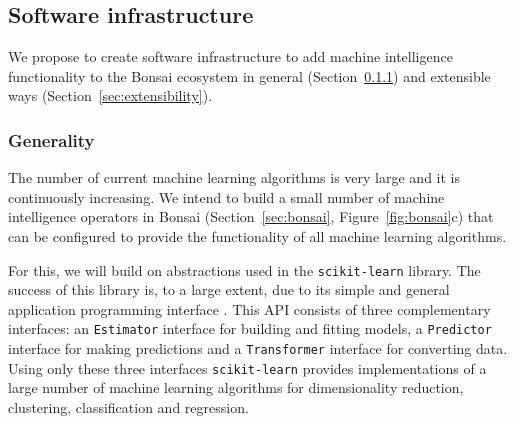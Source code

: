 \subsection{Software infrastructure}
\label{sec:infrastructure}

We propose to create software infrastructure to add machine intelligence
functionality to the Bonsai ecosystem in general
(Section~\ref{sec:generality}) and extensible ways
(Section~\ref{sec:extensibility}).

\subsubsection{Generality}
\label{sec:generality}

The number of current machine learning algorithms is very large and it is
continuously increasing. We intend to build a small number of machine
intelligence operators in Bonsai (Section~\ref{sec:bonsai},
Figure~\ref{fig:bonsai}c) that can be configured to provide the functionality
of all machine learning algorithms.

For this, we will build on abstractions used in the \texttt{scikit-learn}
library. The success of this library is, to a large extent, due to its simple
and general application programming interface \citep[API;][]{buitinckEtAl13}.
%
This API consists of three complementary interfaces: an \texttt{Estimator}
interface for building and fitting models, a \texttt{Predictor} interface for
making predictions and a \texttt{Transformer} interface for converting data.
%
Using only these three interfaces \texttt{scikit-learn} provides
implementations of a large number of machine learning algorithms for
dimensionality reduction, clustering, classification and regression.

